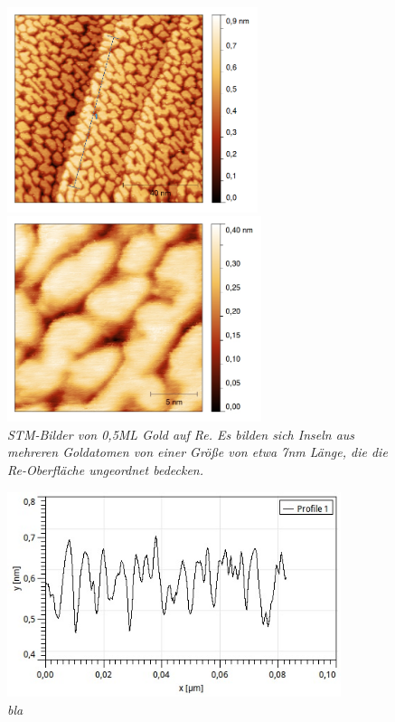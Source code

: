 \begin{figure}[htbp]
	\begin{minipage}[b]{0.5\textwidth} 
		\includegraphics[height=6cm]{profilhalbeML.png}
	\end{minipage}
	\hfill
	\begin{minipage}[b]{0.5\textwidth}
		\includegraphics[height=6cm]{halbeML.jpg}
	\end{minipage}
	\caption{\textit{STM-Bilder von 0,5ML Gold auf Re. Es bilden sich Inseln aus mehreren Goldatomen
	von einer Größe von etwa 7nm Länge, die die Re-Oberfläche ungeordnet bedecken.}}
	\label{halbeML2stm} 
\end{figure}

\begin{figure}[htbp]
	\centering
		\includegraphics[height=6cm]{profilhalbeML.jpg}
	\caption{\textit{bla}}
	\label{profilhalbeML} 
\end{figure}

\FloatBarrier